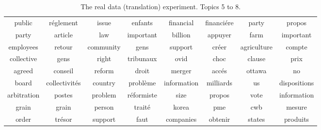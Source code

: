\documentclass{article}
\begin{document}
\begin{table*}[h!]
\begin{tabular}{cc|cc|cc|cc}
                public &           r\'eglement &                 issue &              enfants &             financial &          financi\'ere &                 party &               propos  \\ 
                 party &              article &                   law &            important &               billion &              appuyer &                  farm &            important  \\ 
             employees &               retour &             community &                 gens &               support &               cr\'eer &           agriculture &               compte  \\ 
            collective &                 gens &                 right &            tribunaux &                  ovid &                 choc &                clause &                 prix  \\ 
                agreed &              conseil &                reform &                droit &                merger &               acc\'es &                ottawa &                   no  \\ 
                 board &       collectivit\'es &               country &            probl\`eme &           information &            milliards &                    us &         dispositions  \\ 
           arbitration &               postes &               problem &          r\'eformiste &                  size &               propos &                  vote &          information  \\ 
                 grain &                grain &                person &              trait\'e &                 korea &                  pme &                   cwb &               mesure  \\ 
                 order &              tr\'esor &               support &                 faut &             companies &              obtenir &                states &             produits  \\ 
 \end{tabular}
\caption{ The real data (translation) experiment. Topics 5 to 8. } 
\label{tab:2}
\end{table*}
\setlength{\textfloatsep}{9pt}
\end{document}
